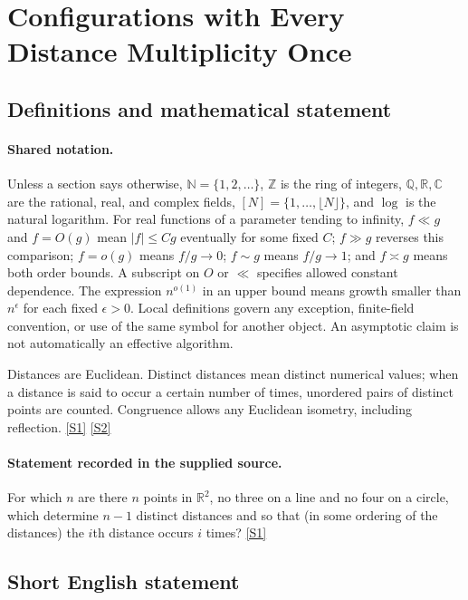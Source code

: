 \documentclass[11pt,a4paper]{article}
\newcommand{\N}{\mathbb{N}}
\newcommand{\Z}{\mathbb{Z}}
\newcommand{\Q}{\mathbb{Q}}
\newcommand{\R}{\mathbb{R}}
\newcommand{\C}{\mathbb{C}}
\newcommand{\sref}[2]{\hyperlink{source:#1:#2}{[S#2]}}
\begin{document}
\section{Configurations with Every Distance Multiplicity Once}\label{statement}


\subsection{Definitions and mathematical statement}

\paragraph{Shared notation.}Unless a section says otherwise, $\N=\{1,2,\ldots\}$,
$\Z$ is the ring of integers, $\Q,\R,\C$ are the rational, real, and complex
fields, $[N]=\{1,\ldots,\lfloor N\rfloor\}$, and $\log$ is the natural
logarithm. For real functions of a parameter tending to infinity,
$f\ll g$ and $f=O(g)$ mean $|f|\leq Cg$ eventually for some fixed $C$;
$f\gg g$ reverses this comparison; $f=o(g)$ means $f/g\to0$;
$f\sim g$ means $f/g\to1$; and $f\asymp g$ means both order bounds.
A subscript on $O$ or $\ll$ specifies allowed constant dependence.
The expression $n^{o(1)}$ in an upper bound means growth smaller than
$n^\epsilon$ for each fixed $\epsilon>0$. Local definitions govern any
exception, finite-field convention, or use of the same symbol for another
object. An asymptotic claim is not automatically an effective algorithm.



Distances are Euclidean. Distinct distances mean distinct numerical values; when a distance is said to occur a certain number of times, unordered pairs of distinct points are counted. Congruence allows any Euclidean isometry, including reflection. \sref{statement}{1} \sref{statement}{2}

\paragraph{Statement recorded in the supplied source.}
For which $n$ are there $n$ points in $\mathbb{R}^2$, no three on a line and no four on a circle, which determine $n-1$ distinct distances and so that (in some ordering of the distances) the $i$th distance occurs $i$ times? \sref{statement}{1}

\subsection{Short English statement}
\end{document}
